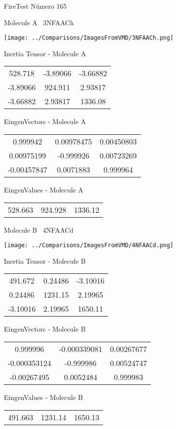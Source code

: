 \vtab[-3cm]
\begin{center}
{\large FireTest \tab Número 165}
\end{center}
\begin{multicols}{2}
\begin{center}

Molecule A \
3NFAACh

\texttt{[image: ../Comparisons/ImagesFromVMD/3NFAACh.png]}

Inertia Tensor - Molecule A \\
\begin{tabular}{|c c c|}
528.718	 & 	-3.89066	 & 	-3.66882	 \\
-3.89066	 & 	924.911	 & 	2.93817	 \\
-3.66882	 & 	2.93817	 & 	1336.08
\end{tabular}

\vtab
 EingenVectors - Molecule A     \\
\begin{tabular}{|c c c|}
0.999942	 & 	0.00978475	 & 	0.00450803	 \\
0.00975199	 & 	-0.999926	 & 	0.00723269	 \\
-0.00457847	 & 	0.0071883	 & 	0.999964
\end{tabular}

\vtab
 EingenValues - Molecule A     \\
\begin{tabular}{|c c c|}
528.663	 & 	924.928	 & 	1336.12	 \\
\end{tabular}
\columnbreak

Molecule B \
4NFAACd

\texttt{[image: ../Comparisons/ImagesFromVMD/4NFAACd.png]}

Inertia Tensor - Molecule B \\
\begin{tabular}{|c c c|}
491.672	 & 	0.24486	 & 	-3.10016	 \\
0.24486	 & 	1231.15	 & 	2.19965	 \\
-3.10016	 & 	2.19965	 & 	1650.11
\end{tabular}

\vtab
 EingenVectors - Molecule B     \\
\begin{tabular}{|c c c|}
0.999996	 & 	-0.000339081	 & 	0.00267677	 \\
-0.000353124	 & 	-0.999986	 & 	0.00524747	 \\
-0.00267495	 & 	0.0052484	 & 	0.999983
\end{tabular}

\vtab
 EingenValues - Molecule B     \\
\begin{tabular}{|c c c|}
491.663	 & 	1231.14	 & 	1650.13	 \\
\end{tabular}

\end{center}
\end{multicols}

